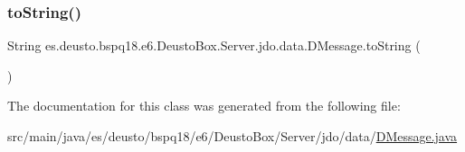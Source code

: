 \subsubsection{\texorpdfstring{to\+String()}{toString()}}
{\footnotesize\ttfamily String es.\+deusto.\+bspq18.\+e6.\+Deusto\+Box.\+Server.\+jdo.\+data.\+D\+Message.\+to\+String (\begin{DoxyParamCaption}{ }\end{DoxyParamCaption})}



The documentation for this class was generated from the following file\+:\begin{DoxyCompactItemize}
\item 
src/main/java/es/deusto/bspq18/e6/\+Deusto\+Box/\+Server/jdo/data/\mbox{\hyperlink{_d_message_8java}{D\+Message.\+java}}\end{DoxyCompactItemize}
